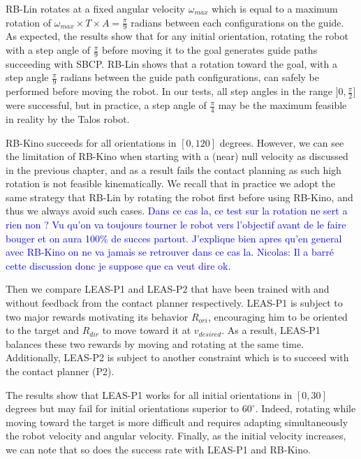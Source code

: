 RB-Lin rotates at a fixed angular velocity $\omega_{max}$ which is equal to a maximum rotation of $\omega_{max} \times T \times A = \frac{\pi}{9}$ radians between each configurations on the guide. As expected, the results show that for any initial orientation, rotating the robot with a step angle of $\frac{\pi}{9}$ before moving it to the goal generates guide paths succeeding with SBCP. 
RB-Lin shows that a rotation toward the goal, with a step angle $\frac{\pi}{9}$ radians between the guide path configurations, can safely be performed before moving the robot. 
In our tests, all step angles in the range $]0,\frac{\pi}{2}]$ were successful, but in practice, a step angle of $\frac{\pi}{4}$ may be the maximum feasible in reality by the Talos robot.

RB-Kino succeeds for all orientations in $[0,120]$ degrees. 
However, we can see the limitation of RB-Kino when starting with a (near) null velocity as discussed in the previous chapter, and as a result fails the contact planning as such high rotation is not feasible kinematically. 
We recall that in practice we adopt the same strategy that RB-Lin by rotating the robot first before using RB-Kino, and thus we always avoid such cases.
\textcolor{blue}{Dans ce cas la, ce test sur la rotation ne sert a rien non ? Vu qu'on va toujours tourner le robot vers l'objectif avant de le faire bouger et on aura 100\% de succes partout. J'explique bien apres qu'en general avec RB-Kino on ne va jamais se retrouver dans ce cas la. Nicolas: Il a barré cette discussion donc je suppose que ca veut dire ok.}

Then we compare LEAS-P1 and LEAS-P2 that have been trained with and without feedback from the contact planner respectively.
LEAS-P1 is subject to two major rewards motivating its behavior $R_{ori}$, encouraging him to be oriented to the target and $R_{dir}$ to move toward it at $v_{desired}$. 
As a result, LEAS-P1 balances these two rewards by moving and rotating at the same time. 
Additionally, LEAS-P2 is subject to another constraint which is to succeed with the contact planner (P2).

The results show that LEAS-P1 works for all initial orientations in $[0,30]$ degrees but may fail for initial orientations superior to $60^{\circ}$.
Indeed, rotating while moving toward the target is more difficult and requires adapting simultaneously the robot velocity and angular velocity.
Finally, as the initial velocity increases, we can note that so does the success rate with LEAS-P1 and RB-Kino.

